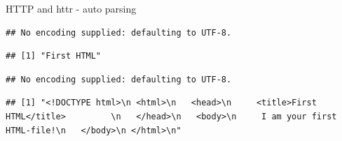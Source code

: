 \documentclass[ignorenonframetext,]{beamer}
\newenvironment{Shaded}{\begin{snugshade}}{\end{snugshade}}
\newcommand{\KeywordTok}[1]{\textcolor[rgb]{0.13,0.29,0.53}{\textbf{{#1}}}}
\newcommand{\DataTypeTok}[1]{\textcolor[rgb]{0.13,0.29,0.53}{{#1}}}
\newcommand{\StringTok}[1]{\textcolor[rgb]{0.31,0.60,0.02}{{#1}}}
\newcommand{\NormalTok}[1]{{#1}}
\begin{document}
\begin{frame}[fragile]{HTTP and httr - auto parsing}

\begin{Shaded}
\end{Shaded}

\begin{verbatim}
## No encoding supplied: defaulting to UTF-8.
\end{verbatim}

\begin{verbatim}
## [1] "First HTML"
\end{verbatim}

\begin{Shaded}
\end{Shaded}

\begin{verbatim}
## No encoding supplied: defaulting to UTF-8.
\end{verbatim}

\begin{verbatim}
## [1] "<!DOCTYPE html>\n <html>\n   <head>\n     <title>First HTML</title>         \n   </head>\n   <body>\n     I am your first HTML-file!\n   </body>\n </html>\n"
\end{verbatim}

\end{frame}
\end{document}
